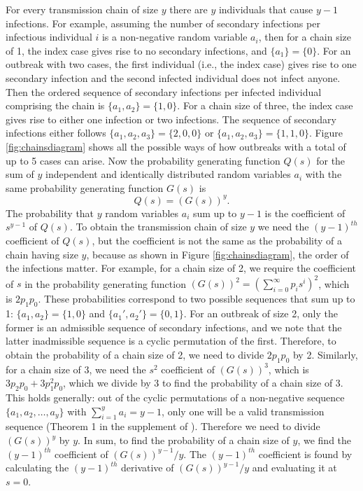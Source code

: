 \documentclass{imammb}
\numberwithin{equation}{section}
\begin{document}
For every transmission chain of size $y$ there are $y$ individuals that cause $y-1$ infections. For example, assuming the number of secondary infections per infectious individual $i$ is a non-negative random variable $a_i$, then for a chain size of 1, the index case gives rise to no secondary infections, and $\{a_1\} = \{ 0\}$. For an outbreak with two cases, the first individual (i.e., the index case) gives rise to one secondary infection and the second infected individual does not infect anyone. Then the ordered sequence of secondary infections per infected individual comprising the chain is $\{a_1, a_2\} = \{1, 0\}$. For a chain size of three, the index case gives rise to either one infection or two infections. The sequence of secondary infections either follows $\{a_1, a_2, a_3\} = \{2, 0, 0\}$ or $\{a_1, a_2, a_3\} = \{1, 1, 0\}$. Figure \ref{fig:chainsdiagram} shows all the possible ways of how outbreaks with a total of up to 5 cases can arise.  
Now the probability generating function $Q(s)$ for the sum of $y$ independent and identically distributed random variables $a_i$ with the same probability generating function $G(s)$ is 
$$Q(s) = (G(s))^y.$$
The probability that $y$ random variables $a_i$ sum up to $y-1$ is the coefficient of $s^{y-1}$ of $Q(s)$. To obtain the transmission chain of size $y$ we need the $(y-1)^{th}$ coefficient of $Q(s)$, but the coefficient is not the same as the probability of a chain having size $y$, because as shown in Figure \ref{fig:chainsdiagram}, the order of the infections matter. For example, for a chain size of 2, we require the coefficient of $s$ in the probability generating function $(G(s))^2 = (\sum_{i=0}^\infty p_i s^i)^2$, which is $2 p_1 p_0$. These probabilities correspond to two possible sequences that sum up to 1: $\{a_1 ,a_2\} = \{1, 0\}$ and $\{a_1', a_2'\} = \{0 ,1\}$. For an outbreak of size 2, only the former is an admissible sequence of secondary infections, and we note that the latter inadmissible sequence is a cyclic permutation of the first. Therefore, to obtain the probability of a chain size of 2, we need to divide $2 p_1 p_0$ by 2. Similarly, for a chain size of 3, we need the $s^2$ coefficient  of $(G(s))^3$, which is $3p_2 p_0 + 3 p_1^2 p_0$, which we divide by 3 to find the probability of a chain size of 3.  This holds generally: out of the cyclic permutations of a non-negative sequence $\{a_1, a_2,\dots,a_y\}$ with $\sum_{i=1}^y a_i = y-1$, only one will be a valid transmission sequence (Theorem 1 in the supplement of \citet{Blumberg2013-xv}). Therefore we need to divide $(G(s))^y$ by $y$. In sum, to find the probability of a chain size of $y$, we find the $(y-1)^{th}$ coefficient of $(G(s))^{y-1}/y $. The $(y-1)^{th}$ coefficient is found by calculating the $(y-1)^{th}$ derivative  of $(G(s))^{y-1}/y $  and evaluating it at $s=0$. 
\end{document}

